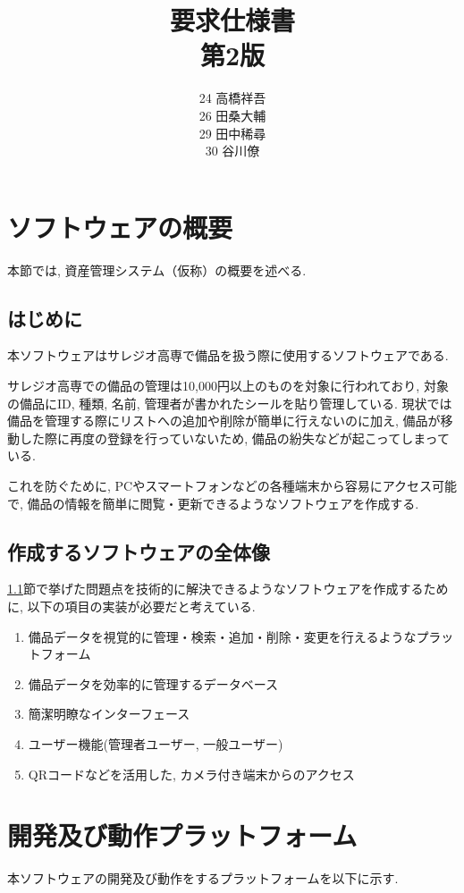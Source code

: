 \documentclass[11ptm]{jsarticle}
\title{{\Huge 要求仕様書}\\第2版}
\author{24 高橋祥吾\\26 田桑大輔\\29 田中稀尋\\30 谷川僚}
\date{}
\begin{document}
\maketitle
\clearpage

\tableofcontents
\clearpage

\section{ソフトウェアの概要}
\label{sec:ソフトウェアの概要}
本節では, 資産管理システム（仮称）の概要を述べる.

\subsection{はじめに}
\label{subsec:はじめに}
本ソフトウェアはサレジオ高専で備品を扱う際に使用するソフトウェアである. \par
サレジオ高専での備品の管理は10,000円以上のものを対象に行われており, 対象の備品にID, 種類, 名前, 管理者が書かれたシールを貼り管理している. 現状では備品を管理する際にリストへの追加や削除が簡単に行えないのに加え, 備品が移動した際に再度の登録を行っていないため, 備品の紛失などが起こってしまっている.\par
これを防ぐために, PCやスマートフォンなどの各種端末から容易にアクセス可能で, 備品の情報を簡単に閲覧・更新できるようなソフトウェアを作成する.

\subsection{作成するソフトウェアの全体像}
\label{subsec:作成するソフトウェアの全体像}
\ref{subsec:はじめに}節で挙げた問題点を技術的に解決できるようなソフトウェアを作成するために, 以下の項目の実装が必要だと考えている.
\begin{enumerate}
  \item 備品データを視覚的に管理・検索・追加・削除・変更を行えるようなプラットフォーム
  \item 備品データを効率的に管理するデータベース
  \item 簡潔明瞭なインターフェース
  \item ユーザー機能(管理者ユーザー, 一般ユーザー)
  \item QRコードなどを活用した, カメラ付き端末からのアクセス
\end{enumerate}


\newpage
\section{開発及び動作プラットフォーム}
\label{sec:開発及び動作プラットフォーム}
本ソフトウェアの開発及び動作をするプラットフォームを以下に示す.
\end{document}
